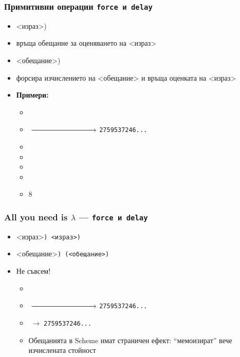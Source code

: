 \documentclass{beamer}
\begin{document}
\begin{frame}
  \frametitle{Примитивни операции \tt{force} и \tt{delay}}

  \begin{itemize}[<+->]
  \item {}<израз>\tta)
  \item връща \alert{обещание} за оценяването на <израз> 
  \item {}<обещание>\tta)
  \item форсира изчислението на <обещание> и връща оценката на <израз> 
    \pause
  \item \textbf{Примери:}
    \begin{itemize}
    \item {}
    \item {}$\;\xrightarrow{\hspace*{3cm}}\;$\tt{2759537246...}
    \item {}
    \item {}
    \item {}
    \item {}
    \item {}8
    \end{itemize}
  \end{itemize}
\end{frame}

\begin{frame}[fragile]
  \frametitle{All you need is $\lambda$ --- \tt{force} и \tt{delay}}

  \begin{itemize}
  \item {}<израз>\tt) \eqv {}<израз>\tt)
  \item {}<обещание>\tt) \eqv \tt(<обещание>\tt)\pause
  \item \alert{Не съвсем!} \pause
    \begin{itemize}[<.->]
    \item {}
    \item {}$\;\xrightarrow{\hspace*{3cm}}\;$\tt{2759537246...}
    \item {}$\;\rightarrow\;$\tt{2759537246...} \pause
    \item Обещанията в Scheme имат страничен ефект: ``мемоизират'' вече изчислената стойност
    \end{itemize}
  \end{itemize}
\end{frame}
\end{document}
